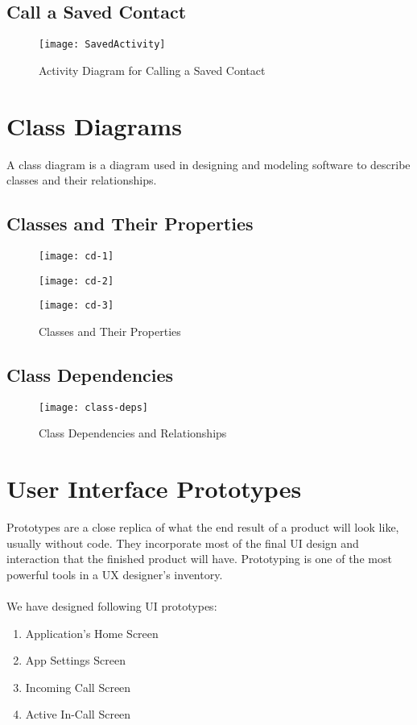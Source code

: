 \subsection{Call a Saved Contact}
\begin{figure}[H]
    \centering
    \texttt{[image: SavedActivity]}
    \caption{Activity Diagram for Calling a Saved Contact}
    \label{fig:saved_activity}
\end{figure}
\clearpage

\section{Class Diagrams}
A class diagram is a diagram used in designing and modeling software to describe classes and their relationships.

\subsection{Classes and Their Properties}
\begin{figure}[H]
    \centering
    \texttt{[image: cd-1]}
\end{figure}
\clearpage
\begin{figure}[H]
    \centering
    \texttt{[image: cd-2]}
\end{figure}
\clearpage
\begin{figure}[H]
    \centering
    \texttt{[image: cd-3]}
    \caption{Classes and Their Properties}
    \label{fig:class-props}
\end{figure}
\clearpage
\subsection{Class Dependencies}
\begin{figure}[H]
    \centering
    \texttt{[image: class-deps]}
    \caption{Class Dependencies and Relationships}
    \label{fig:class-dep}
\end{figure}
\clearpage

\section{User Interface Prototypes}
Prototypes are a close replica of what the end result of a product will look like, usually without code. They incorporate most of the final UI design and interaction that the finished product will have. Prototyping is one of the most powerful tools in a UX designer's inventory.
\\ \\
We have designed following UI prototypes:
\begin{enumerate}
 \item Application's Home Screen
 \item App Settings Screen
 \item Incoming Call Screen
 \item Active In-Call Screen
\end{enumerate}

